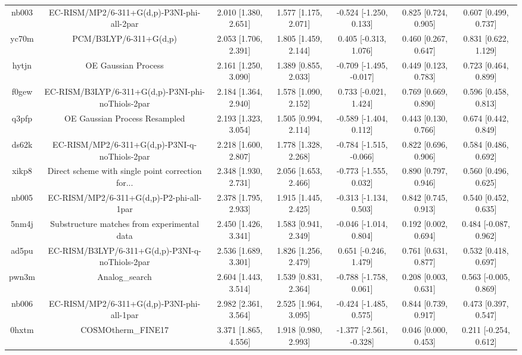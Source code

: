 \documentclass{article}
\begin{document}
\begin{center}
\begin{longtable}{|ccccccc|}
 nb003 &         EC-RISM/MP2/6-311+G(d,p)-P3NI-phi-all-2par &  2.010 [1.380, 2.651] &  1.577 [1.175, 2.071] &   -0.524 [-1.250, 0.133] &  0.825 [0.724, 0.905] &   0.607 [0.499, 0.737] \\
 yc70m &                             PCM/B3LYP/6-311+G(d,p) &  2.053 [1.706, 2.391] &  1.805 [1.459, 2.144] &    0.405 [-0.313, 1.076] &  0.460 [0.267, 0.647] &   0.831 [0.622, 1.129] \\
 hytjn &                                OE Gaussian Process &  2.161 [1.250, 3.090] &  1.389 [0.855, 2.033] &  -0.709 [-1.495, -0.017] &  0.449 [0.123, 0.783] &   0.723 [0.464, 0.899] \\
 f0gew &  EC-RISM/B3LYP/6-311+G(d,p)-P3NI-phi-noThiols-2par &  2.184 [1.364, 2.940] &  1.578 [1.090, 2.152] &    0.733 [-0.021, 1.424] &  0.769 [0.669, 0.890] &   0.596 [0.458, 0.813] \\
 q3pfp &                      OE Gaussian Process Resampled &  2.193 [1.323, 3.054] &  1.505 [0.994, 2.114] &   -0.589 [-1.404, 0.112] &  0.443 [0.130, 0.766] &   0.674 [0.442, 0.849] \\
 ds62k &      EC-RISM/MP2/6-311+G(d,p)-P3NI-q-noThiols-2par &  2.218 [1.600, 2.807] &  1.778 [1.328, 2.268] &  -0.784 [-1.515, -0.066] &  0.822 [0.696, 0.906] &   0.584 [0.486, 0.692] \\
 xikp8 &  Direct scheme with single point correction for... &  2.348 [1.930, 2.731] &  2.056 [1.653, 2.466] &   -0.773 [-1.555, 0.032] &  0.890 [0.797, 0.946] &   0.560 [0.496, 0.625] \\
 nb005 &           EC-RISM/MP2/6-311+G(d,p)-P2-phi-all-1par &  2.378 [1.795, 2.933] &  1.915 [1.445, 2.425] &   -0.313 [-1.134, 0.503] &  0.842 [0.745, 0.913] &   0.540 [0.452, 0.635] \\
 5nm4j &        Substructure matches from experimental data &  2.450 [1.426, 3.341] &  1.583 [0.941, 2.349] &   -0.046 [-1.014, 0.804] &  0.192 [0.002, 0.694] &  0.484 [-0.087, 0.962] \\
 ad5pu &    EC-RISM/B3LYP/6-311+G(d,p)-P3NI-q-noThiols-2par &  2.536 [1.689, 3.301] &  1.826 [1.256, 2.479] &    0.651 [-0.246, 1.479] &  0.761 [0.631, 0.877] &   0.532 [0.418, 0.697] \\
 pwn3m &                                     Analog\_search &  2.604 [1.443, 3.514] &  1.539 [0.831, 2.364] &   -0.788 [-1.758, 0.061] &  0.208 [0.003, 0.631] &  0.563 [-0.005, 0.869] \\
 nb006 &         EC-RISM/MP2/6-311+G(d,p)-P3NI-phi-all-1par &  2.982 [2.361, 3.564] &  2.525 [1.964, 3.095] &   -0.424 [-1.485, 0.575] &  0.844 [0.739, 0.917] &   0.473 [0.397, 0.547] \\
 0hxtm &                                 COSMOtherm\_FINE17 &  3.371 [1.865, 4.556] &  1.918 [0.980, 2.993] &  -1.377 [-2.561, -0.328] &  0.046 [0.000, 0.453] &  0.211 [-0.254, 0.612] \\
\end{longtable}
\end{center}
\end{document}
